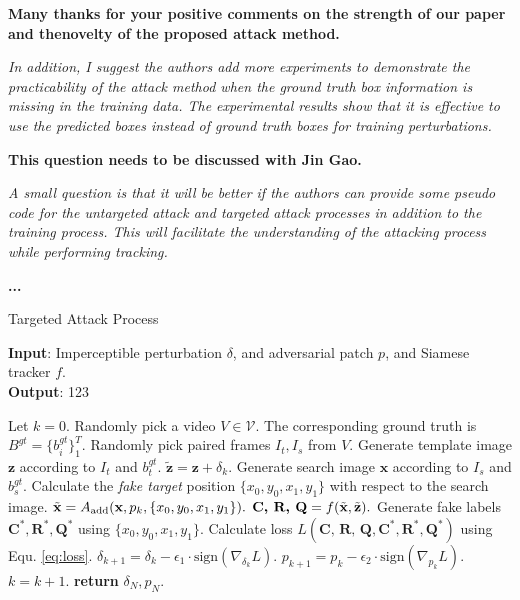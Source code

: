 \documentclass[12pt]{article}
\begin{document}
\textbf{Many thanks for your positive comments on the strength of our paper and thenovelty of the proposed attack method.}

\textit{In addition, I suggest the authors add more experiments to demonstrate the practicability of the attack method when the ground truth box information is missing in the training data. The experimental results show that it is effective to use the predicted boxes instead of ground truth boxes for training perturbations.}

\textbf{This question needs to be discussed with Jin Gao.}

\textit{A small question is that it will be better if the authors can provide some pseudo code for the untargeted attack and targeted attack processes in addition to the training process. This will facilitate the understanding of the attacking process while performing tracking.}

\textbf{...}

\begin{algorithm}[tb]
    \caption{Targeted Attack Process}
    \label{alg:algorithm_targeted_attack}
    \textbf{Input}: Imperceptible perturbation $\delta$, and adversarial patch $p$, and Siamese tracker $f$.\\
    \textbf{Output}: 123
    \begin{algorithmic}[1] %
    \STATE Let $k = 0$.
    \STATE Randomly pick a video $V\in \mathcal{V}$. The corresponding ground truth is $B^{gt}=\{b^{gt}_i\}^T_1$.
    \STATE Randomly pick paired frames $I_t, I_s$ from $V$.
    \STATE Generate template image $\textbf{z}$ according to $I_t$ and $b^{gt}_t$.
    \STATE $\tilde{\textbf{z}} = \textbf{z} + \delta_k.$
    \STATE Generate search image $\textbf{x}$ according to $I_s$ and $b^{gt}_s$.
    \STATE Calculate the \textit{fake target} position $\{x_0, y_0, x_1, y_1\}$ with respect to the search image.
    \STATE $\tilde{\textbf x} = A_{\text{add}}(\textbf x, p_k, \{x_0, y_0, x_1, y_1\}).$
    \STATE $\textbf{C, R, Q} = f(\tilde {\textbf x}, \tilde{\textbf z}).$
    \STATE Generate fake labels $\textbf{C}^*,\textbf{R}^*,\textbf{Q}^*$ using $\{x_0, y_0, x_1, y_1\}$.
    \STATE Calculate loss $L(\textbf{C, R, Q}, \textbf{C}^*, \textbf{R}^*, \textbf{Q}^*)$ using Equ. \ref{eq:loss}.
    \STATE $\delta_{k+1} = \delta_{k} - \epsilon_1 \cdot \text{sign}(\nabla_{\delta_k}L).$
    \STATE $p_{k+1} = p_{k} - \epsilon_2 \cdot \text{sign}(\nabla_{p_k}L).$
    \STATE $k = k + 1.$
    \ENDWHILE
    \STATE \textbf{return} $\delta_N, p_N.$
    \end{algorithmic}
  \end{algorithm}
\end{document}
